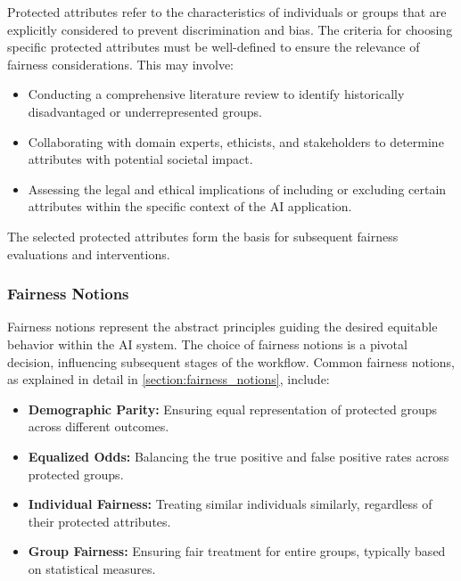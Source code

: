 Protected attributes refer to the characteristics of individuals or groups that are explicitly considered to prevent discrimination and bias. The criteria for choosing specific protected attributes must be well-defined to ensure the relevance of fairness considerations. This may involve:

\begin{itemize}

    \item Conducting a comprehensive literature review to identify historically disadvantaged or underrepresented groups.
    
    \item Collaborating with domain experts, ethicists, and stakeholders to determine attributes with potential societal impact.
    
    \item Assessing the legal and ethical implications of including or excluding certain attributes within the specific context of the AI application.

\end{itemize}

The selected protected attributes form the basis for subsequent fairness evaluations and interventions.

\subsubsection{Fairness Notions}

Fairness notions represent the abstract principles guiding the desired equitable behavior within the AI system. The choice of fairness notions is a pivotal decision, influencing subsequent stages of the workflow. Common fairness notions, as explained in detail in \cref{section:fairness_notions}, include:

\begin{itemize}
  
    \item \textbf{Demographic Parity:} Ensuring equal representation of protected groups across different outcomes.
  
    \item \textbf{Equalized Odds:} Balancing the true positive and false positive rates across protected groups.
  
    \item \textbf{Individual Fairness:} Treating similar individuals similarly, regardless of their protected attributes.
   
    \item \textbf{Group Fairness:} Ensuring fair treatment for entire groups, typically based on statistical measures.

\end{itemize}


